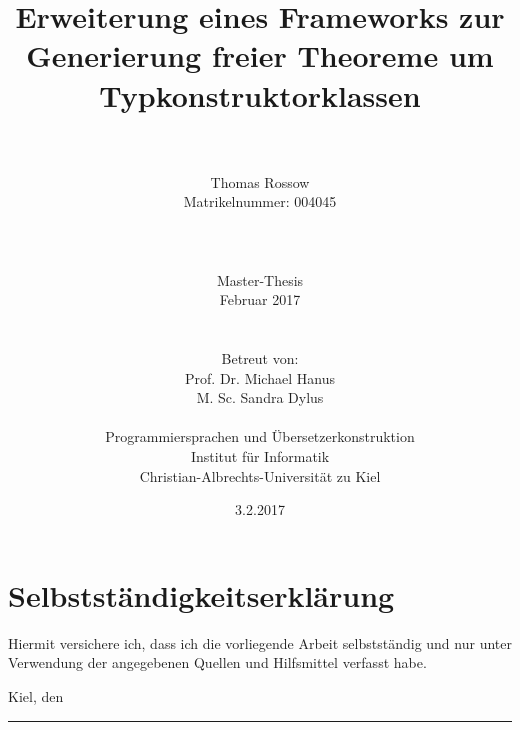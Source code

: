 \documentclass[11pt]{article} %
\title{Erweiterung eines Frameworks zur Generierung freier Theoreme um Typkonstruktorklassen}
\author{
\\
\\
\large{Thomas Rossow} \\
\small{Matrikelnummer: 004045} \\ 
\\
\\
\\
Master-Thesis \\
\small{Februar 2017} \\
\\
\vspace{5cm} \\
\small{Betreut von:} \\ Prof. Dr. Michael Hanus \\ M. Sc. Sandra Dylus \\
\vspace{3cm} \\
\small{Programmiersprachen und Übersetzerkonstruktion} \\ \small{Institut für Informatik} \\ \small{Christian-Albrechts-Universität zu Kiel}
}
\date{} %
\begin{document}
\maketitle
\thispagestyle{empty}

\newpage
\thispagestyle{empty}
\section*{Selbstständigkeitserklärung}
\vspace{15mm}
 
Hiermit versichere ich, dass ich die vorliegende Arbeit selbstständig und nur unter
Verwendung der angegebenen Quellen und Hilfsmittel verfasst habe.

\vspace{30mm}
Kiel, den \date{3.2.2017}\hspace{45mm}
\rule{6cm}{0.1mm}
\vspace{5mm}

\newpage
\tableofcontents 



\clearpage


\clearpage

	
\clearpage


\clearpage


\clearpage


\clearpage


%

\clearpage



\clearpage
\appendix

\end{document}
